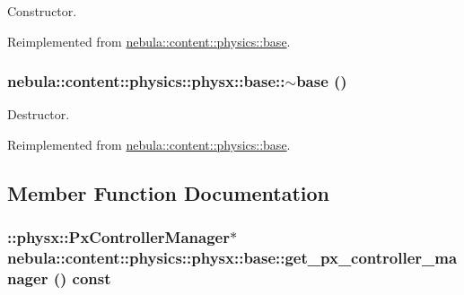 Constructor. 

Reimplemented from \hyperlink{classnebula_1_1content_1_1physics_1_1base_ae24721ae31e950d6630ad284e3af09e1}{nebula::content::physics::base}.\hypertarget{classnebula_1_1content_1_1physics_1_1physx_1_1base_a2f146552e5178c6b616caededeca24c4}{
\subsubsection[{$\sim$base}]{\setlength{\rightskip}{0pt plus 5cm}nebula::content::physics::physx::base::$\sim$base ()}}
\label{classnebula_1_1content_1_1physics_1_1physx_1_1base_a2f146552e5178c6b616caededeca24c4}


Destructor. 

Reimplemented from \hyperlink{classnebula_1_1content_1_1physics_1_1base_a980739fcd78d28fbbe4b02f46b3cd97e}{nebula::content::physics::base}.

\subsection{Member Function Documentation}
\hypertarget{classnebula_1_1content_1_1physics_1_1physx_1_1base_a2cbe05d51dd543c4a073bf233ed9ee06}{
\subsubsection[{get\_\-px\_\-controller\_\-manager}]{\setlength{\rightskip}{0pt plus 5cm}::physx::PxControllerManager$\ast$ nebula::content::physics::physx::base::get\_\-px\_\-controller\_\-manager () const}}
\label{classnebula_1_1content_1_1physics_1_1physx_1_1base_a2cbe05d51dd543c4a073bf233ed9ee06}


